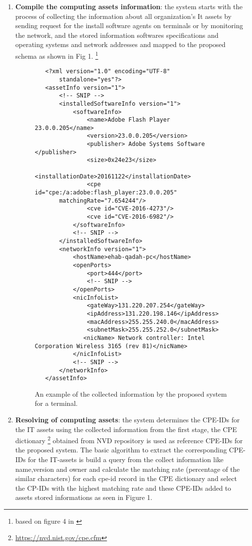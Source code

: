 \documentclass{llncs}
\begin{document}
\begin{enumerate}
 \item \textbf{Compile the computing assets information}: the system starts with the process of collecting the information about all organization's It assets by sending request for the install software agents on terminals or by monitoring the network, and the stored information softwares specifications and operating systems and network addresses and mapped to the proposed schema as shown in Fig 1.  \footnote{based on figure 4 in \cite{paper1}} 
 
 \begin{figure}
 \centering
   \lstset{language=XML}
    \begin{lstlisting}
   <?xml version="1.0" encoding="UTF-8"
       standalone="yes"?>
   <assetInfo version="1">
       <!-- SNIP -->
       <installedSoftwareInfo version="1">
           <softwareInfo>
               <name>Adobe Flash Player 23.0.0.205</name>
               <version>23.0.0.205</version>
               <publisher> Adobe Systems Software </publisher>
               <size>0x24e23</size>
               <installationDate>20161122</installationDate>
               <cpe id="cpe:/a:adobe:flash_player:23.0.0.205"
       matchingRate="7.654244"/>
               <cve id="CVE-2016-4273"/>
               <cve id="CVE-2016-6982"/>
           </softwareInfo>
           <!-- SNIP -->
       </installedSoftwareInfo>
       <networkInfo version="1">
           <hostName>ehab-qadah-pc</hostName>
           <openPorts>
               <port>444</port>
               <!-- SNIP -->
           </openPorts>
           <nicInfoList>
               <gateWay>131.220.207.254</gateWay>
               <ipAddress>131.220.198.146</ipAddress>
               <macAddress>255.255.240.0</macAddress>
               <subnetMask>255.255.252.0</subnetMask>
              <nicName> Network controller: Intel Corporation Wireless 3165 (rev 81)</nicName>
           </nicInfoList>
           <!-- SNIP -->
       </networkInfo>
   </assetInfo>
    \end{lstlisting}
   \caption{An example of the collected information by the proposed system for  a terminal.}
    \end{figure}
   
   \item \textbf{Resolving of computing assets}: the system determines the CPE-IDs for the IT assets using the collected information from the first stage, the CPE dictionary \footnote{\url{https://nvd.nist.gov/cpe.cfm}} obtained from NVD repository is used as reference CPE-IDs for the proposed system. The basic algorithm to extract the corresponding CPE-IDs for the IT-assets is build a query from the collect information like name,version and owner and calculate the matching rate (percentage of the similar characters) for each cpe-id record in the CPE dictionary and select the CP-IDs with the highest matching rate and these CPE-IDs added to assets stored informations as seen in Figure 1.
   

\end{enumerate}
\end{document}
